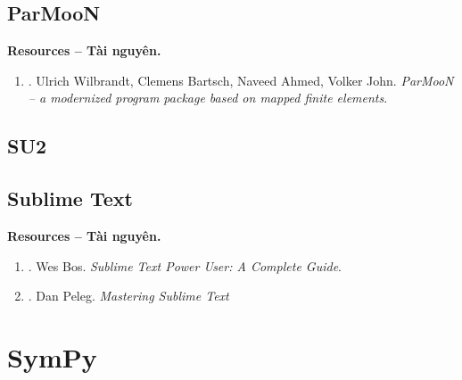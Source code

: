 \documentclass{article}
\begin{document}
\subsection{ParMooN}
\textbf{\textsf{Resources -- Tài nguyên.}}
\begin{enumerate}
	\item \cite{ParMooN2017}. {\sc Ulrich Wilbrandt, Clemens Bartsch, Naveed Ahmed, Volker John}. {\it ParMooN -- a modernized program package based on mapped finite elements}.
\end{enumerate}

\subsection{SU2}

\subsection{Sublime Text}
\textbf{\textsf{Resources -- Tài nguyên.}}
\begin{enumerate}
	\item \cite{Bos2014}. {\sc Wes Bos}. {\it Sublime Text Power User: A Complete Guide}.
	\item \cite{Peleg2014}. {\sc Dan Peleg}. {\it Mastering Sublime Text}
\end{enumerate}


\section{SymPy}
\end{document}

